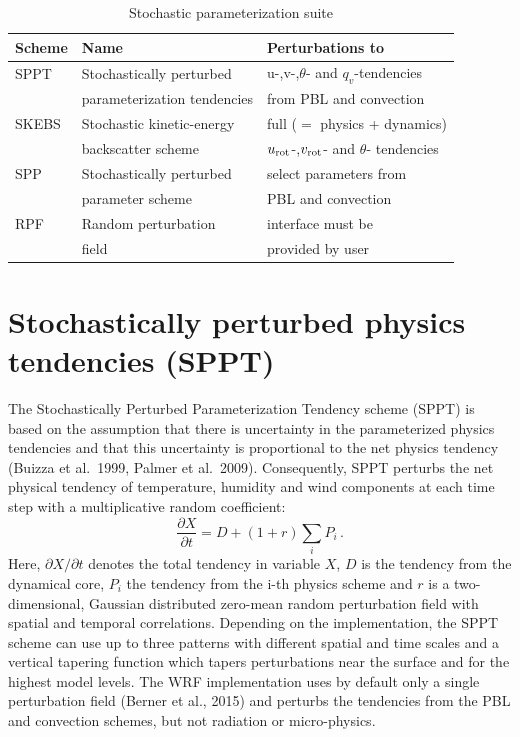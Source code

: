 \begin{table}[h!]
\begin{center}
\caption{Stochastic parameterization suite}
\label{stoch table}
\begin{tabular}{ | l | l | l |}
\hline
Scheme          & Name & Perturbations to \\ 
\hline
SPPT  & Stochastically perturbed    &  u-,v-,$\theta$- and $q_v$-tendencies\\
      & parameterization tendencies &  from PBL and convection\\
SKEBS & Stochastic kinetic-energy   &  full ($=$ physics + dynamics) \\
      & backscatter scheme          &  $u_{\rm rot}$-,$v_{\rm rot}$- and $\theta$- tendencies\\ 
SPP & Stochastically perturbed      &  select parameters from\\
    & parameter scheme              &  PBL and convection \\
RPF & Random perturbation           &  interface must be \\
    & field                         &  provided by user\\
\hline
\end{tabular}
\end{center}
\end{table}

\section {Stochastically perturbed physics tendencies (SPPT)}
The Stochastically Perturbed Parameterization Tendency scheme
(SPPT) is based on the assumption that there is uncertainty
in the parameterized physics tendencies and that this 
uncertainty is proportional to the net physics tendency 
(Buizza et al.\ 1999, Palmer et al.\ 2009).
Consequently, SPPT perturbs the net physical tendency of temperature, 
humidity and wind components at each time step with a multiplicative 
random coefficient:
\begin{equation}
   \frac{\partial X}{\partial t}= D + (1+ r) \sum_i P_i \,.
\end{equation}
Here, ${\partial X}/{\partial t}$ denotes the total tendency in variable $X$, 
$D$ is the tendency from the dynamical core, 
$P_i$ the tendency from the i-th physics scheme 
and $r$ is a two-dimensional, Gaussian distributed zero-mean random
perturbation field with spatial and temporal correlations. 
Depending on
the implementation, the SPPT scheme can use up to three patterns with
different spatial and time scales and a vertical tapering function which 
tapers perturbations near the surface and for the highest model levels.
The WRF implementation uses by default only a single perturbation field (Berner et al., 2015)
and perturbs the tendencies from the PBL and convection schemes, but not radiation
or micro-physics.

